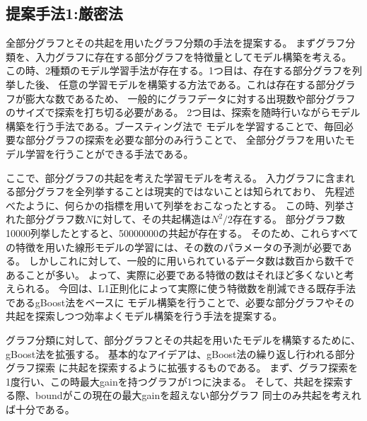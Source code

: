 \subsection{提案手法1:厳密法}
\label{st}
全部分グラフとその共起を用いたグラフ分類の手法を提案する。
まずグラフ分類を、入力グラフに存在する部分グラフを特徴量としてモデル構築を考える。
この時、2種類のモデル学習手法が存在する。1つ目は、存在する部分グラフを列挙した後、
任意の学習モデルを構築する方法である。これは存在する部分グラフが膨大な数であるため、
一般的にグラフデータに対する出現数や部分グラフのサイズで探索を打ち切る必要がある。
2つ目は、探索を随時行いながらモデル構築を行う手法である。ブースティング法で
モデルを学習することで、毎回必要な部分グラフの探索を必要な部分のみ行うことで、
全部分グラフを用いたモデル学習を行うことができる手法である。

ここで、部分グラフの共起を考えた学習モデルを考える。
入力グラフに含まれる部分グラフを全列挙することは現実的ではないことは知られており、
先程述べたように、何らかの指標を用いて列挙をおこなったとする。
この時、列挙された部分グラフ数$N$に対して、その共起構造は$N^2/2$存在する。
部分グラフ数10000列挙したとすると、50000000の共起が存在する。
そのため、これらすべての特徴を用いた線形モデルの学習には、その数のパラメータの予測が必要である。
しかしこれに対して、一般的に用いられているデータ数は数百から数千であることが多い。
よって、実際に必要である特徴の数はそれほど多くないと考えられる。
今回は、L1正則化によって実際に使う特徴数を削減できる既存手法であるgBoost法をベースに
モデル構築を行うことで、必要な部分グラフやその共起を探索しつつ効率よくモデル構築を行う手法を提案する。

グラフ分類に対して、部分グラフとその共起を用いたモデルを構築するために、
gBoost法を拡張する。
基本的なアイデアは、gBoost法の繰り返し行われる部分グラフ探索
に共起を探索するように拡張するものである。
まず、グラフ探索を1度行い、この時最大gainを持つグラフが1つに決まる。
そして、共起を探索する際、boundがこの現在の最大gainを超えない部分グラフ
同士のみ共起を考えれば十分である。

